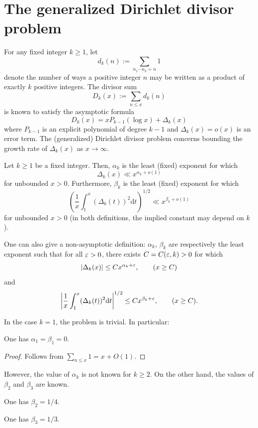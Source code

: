 \chapter{The generalized Dirichlet divisor problem}\label{divisor-chapter}

For any fixed integer $k \ge 1$, let
\[
d_k(n) := \sum_{n_1 \cdots n_k = n}1
\]
denote the number of ways a positive integer $n$ may be written as a product of exactly $k$ positive integers. The divisor sum
\[
D_k(x) := \sum_{n \leq x} d_k(n)
\]
is known to satisfy the asymptotic formula
\[
D_k(x) = x P_{k - 1}(\log x) + \Delta_k(x)
\]
where $P_{k - 1}$ is an explicit polynomial of degree $k-1$ and $\Delta_k(x) = o(x)$ is an error term. The (generalized) Dirichlet divisor problem concerns bounding the growth rate of $\Delta_k(x)$ as $x\to\infty$.

\begin{definition}\label{divisor-def} Let $k \geq 1$ be a fixed integer. Then, $\alpha_k$ is the least (fixed) exponent for which
$$ \Delta_k(x) \ll x^{\alpha_k+o(1)}$$
for unbounded $x > 0$. Furthermore, $\beta_k$ is the least (fixed) exponent for which
\[
\left(\frac{1}{x}\int_1^x (\Delta_k(t))^2\text{d}t\right)^{1/2} \ll x^{\beta_k + o(1)}
\]
for unbounded $x > 0$ (in both definitions, the implied constant may depend on $k$).
\end{definition}

One can also give a non-asymptotic definition: $\alpha_k$, $\beta_k$ are respectively the least exponent such that for all $\varepsilon > 0$, there exists $C = C(\varepsilon, k) > 0$ for which
\[
|\Delta_k(x)| \leq C x^{\alpha_k + \varepsilon},\qquad (x \ge C)
\]
and
\[
\left|\frac{1}{x}\int_1^x(\Delta_k(t))^2\text{d}t\right|^{1/2} \le Cx^{\beta_k + \varepsilon},\qquad (x \ge C).
\]

In the case $k = 1$, the problem is trivial. In particular:

\begin{lemma}[$d_1$ exponent]\label{divisor-1} One has $\alpha_1=\beta_1=0$.
\end{lemma}
\begin{proof}
Follows from $\sum_{n \le x}1 = x + O(1)$.
\end{proof}

However, the value of $\alpha_k$ is not known for $k \ge 2$. On the other hand, the values of $\beta_2$ and $\beta_3$ are known.

\begin{theorem}\label{avg-divisor-2}
One has $\beta_2 = 1/4$.
\end{theorem}
\begin{theorem}\label{avg-divisor-3}
One has $\beta_3 = 1/3$.
\end{theorem}

